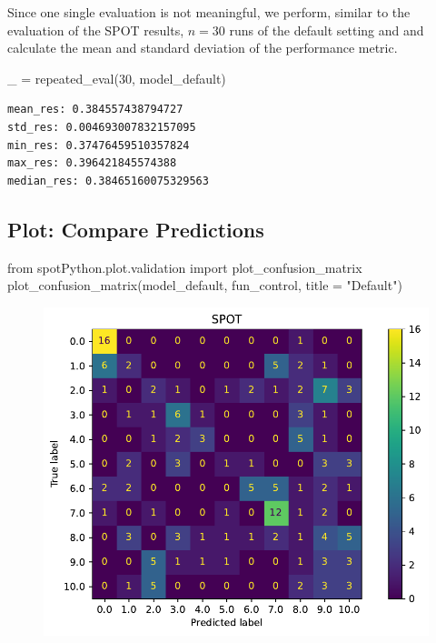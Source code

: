 \documentclass[
  letterpaper,
  DIV=11,
  numbers=noendperiod]{scrreprt}
\newenvironment{Shaded}{\begin{snugshade}}{\end{snugshade}}
\newcommand{\DecValTok}[1]{\textcolor[rgb]{0.68,0.00,0.00}{#1}}
\newcommand{\ImportTok}[1]{\textcolor[rgb]{0.00,0.46,0.62}{#1}}
\newcommand{\NormalTok}[1]{\textcolor[rgb]{0.00,0.23,0.31}{#1}}
\newcommand{\OperatorTok}[1]{\textcolor[rgb]{0.37,0.37,0.37}{#1}}
\newcommand{\StringTok}[1]{\textcolor[rgb]{0.13,0.47,0.30}{#1}}
\begin{document}
Since one single evaluation is not meaningful, we perform, similar to
the evaluation of the SPOT results, \(n=30\) runs of the default setting
and and calculate the mean and standard deviation of the performance
metric.

\begin{Shaded}
\begin{Highlighting}[]
\NormalTok{\_ }\OperatorTok{=}\NormalTok{ repeated\_eval(}\DecValTok{30}\NormalTok{, model\_default)}
\end{Highlighting}
\end{Shaded}

\begin{verbatim}
mean_res: 0.384557438794727
std_res: 0.004693007832157095
min_res: 0.37476459510357824
max_res: 0.396421845574388
median_res: 0.38465160075329563
\end{verbatim}

\hypertarget{plot-compare-predictions-3}{%
\subsection{Plot: Compare
Predictions}\label{plot-compare-predictions-3}}

\begin{Shaded}
\begin{Highlighting}[]
\ImportTok{from}\NormalTok{ spotPython.plot.validation }\ImportTok{import}\NormalTok{ plot\_confusion\_matrix}
\NormalTok{plot\_confusion\_matrix(model\_default, fun\_control, title }\OperatorTok{=} \StringTok{"Default"}\NormalTok{)}
\end{Highlighting}
\end{Shaded}

\begin{figure}[H]

{\centering \includegraphics{18_spot_hpt_sklearn_multiclass_classification_svc_files/figure-pdf/cell-42-output-1.pdf}

}

\end{figure}
\end{document}
